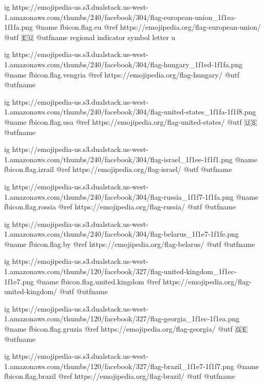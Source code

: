  
 
 
 
 

\ifcmt

  ig https://emojipedia-us.s3.dualstack.us-west-1.amazonaws.com/thumbs/240/facebook/304/flag-european-union_1f1ea-1f1fa.png
  @name fbicon.flag.eu
  @ref https://emojipedia.org/flag-european-union/
  @utf 🇪🇺
  @utfname regional indicator symbol letter u

  ig https://emojipedia-us.s3.dualstack.us-west-1.amazonaws.com/thumbs/240/facebook/304/flag-hungary_1f1ed-1f1fa.png
  @name fbicon.flag.vengria
  @ref https://emojipedia.org/flag-hungary/
  @utf
  @utfname

  ig https://emojipedia-us.s3.dualstack.us-west-1.amazonaws.com/thumbs/240/facebook/304/flag-united-states_1f1fa-1f1f8.png
  @name fbicon.flag.usa
  @ref https://emojipedia.org/flag-united-states/
  @utf 🇺🇸
  @utfname

  ig https://emojipedia-us.s3.dualstack.us-west-1.amazonaws.com/thumbs/240/facebook/304/flag-israel_1f1ee-1f1f1.png
  @name fbicon.flag.izrail
  @ref https://emojipedia.org/flag-israel/
  @utf
  @utfname

  ig https://emojipedia-us.s3.dualstack.us-west-1.amazonaws.com/thumbs/240/facebook/304/flag-russia_1f1f7-1f1fa.png
  @name fbicon.flag.rossia
  @ref https://emojipedia.org/flag-russia/
  @utf 
  @utfname

  ig https://emojipedia-us.s3.dualstack.us-west-1.amazonaws.com/thumbs/240/facebook/304/flag-belarus_1f1e7-1f1fe.png
  @name fbicon.flag.by
  @ref https://emojipedia.org/flag-belarus/
  @utf
  @utfname

	ig https://emojipedia-us.s3.dualstack.us-west-1.amazonaws.com/thumbs/120/facebook/327/flag-united-kingdom_1f1ec-1f1e7.png
	@name fbicon.flag.united.kingdom
	@ref https://emojipedia.org/flag-united-kingdom/
	@utf
	@utfname

	ig https://emojipedia-us.s3.dualstack.us-west-1.amazonaws.com/thumbs/120/facebook/327/flag-georgia_1f1ec-1f1ea.png
	@name fbicon.flag.gruzia
	@ref https://emojipedia.org/flag-georgia/
	@utf 🇬🇪
	@utfname

	ig https://emojipedia-us.s3.dualstack.us-west-1.amazonaws.com/thumbs/120/facebook/327/flag-brazil_1f1e7-1f1f7.png
	@name fbicon.flag.brazil
	@ref https://emojipedia.org/flag-brazil/
	@utf
	@utfname
	
\fi
